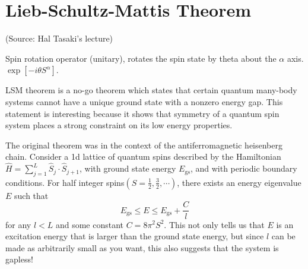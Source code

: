 \documentclass{article}
\begin{document}
\section{Lieb-Schultz-Mattis Theorem}
(Source: Hal Tasaki's lecture)


Spin rotation operator (unitary), rotates the spin state by theta about the $\alpha$ axis.
$\exp{[-i\theta S^{\alpha}]}$.

LSM theorem is a no-go theorem which states that certain quantum many-body systems cannot have a unique ground state with a nonzero energy gap.
This statement is interesting because it shows that symmetry of a quantum spin system places a strong constraint on its low energy properties.

The original theorem was in the context of the antiferromagnetic heisenberg chain. Consider a 1d lattice of quantum spins described by the Hamiltonian
$\hat{H} = \sum^{L}_{j=1} \hat{S}_j \cdot \hat{S}_{j+1}$, with ground state energy $E_{\text{gs}}$, and with periodic boundary conditions.
For half integer spins$\left(S = \frac{1}{2}, \frac{3}{2}, \cdots\right)$, there exists an energy eigenvalue $E$ such that
\begin{equation}
    E_{\text{gs}} \leq E \leq E_{\text{gs}} + \frac{C}{l}
\end{equation}
for any $l<L$ and some constant $C = 8\pi^2S^2$. This not only tells us that $E$ is an excitation energy that is larger than the ground state energy, but since $l$ can be made as arbitrarily small as you want, this also suggests that the system is gapless!
\end{document}
